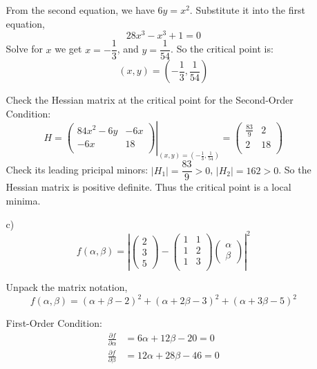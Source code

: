 \documentclass{article}
\begin{document}
\begin{enumerate}
\begin{enumerate}
        From the second equation, we have $6y = x^2$. Substitute it into the first equation,
        $$ 28x^3 - x^3 + 1 = 0 $$
        Solve for $x$ we get $x = -\dfrac{1}{3}$, and $y = \dfrac{1}{54}$. So the critical point is:
        $$ (x, y) = \left( -\frac{1}{3}, \frac{1}{54} \right) $$
        
        Check the Hessian matrix at the critical point for the Second-Order Condition:
        \[
            H = 
            \left.\begin{pmatrix}
                84x^2 - 6y  &  -6x  \\
                -6x         &  18   \\
            \end{pmatrix}
            \right\rvert_{(x, y) = \left( -\frac{1}{3}, \frac{1}{54} \right)}   
            = \begin{pmatrix}
                \frac{83}{9} &  2 \\
                2            & 18 \\
            \end{pmatrix}
        \]
        Check its leading pricipal minors: $|H_1| = \dfrac{83}{9} > 0$, $|H_2| = 162 > 0$. 
        So the Hessian matrix is positive definite. Thus the critical point is a local minima.\\
        
        \item[c)] \[ f(\alpha, \beta) = \left\vert 
            \begin{pmatrix} 2 \\ 3 \\ 5 \end{pmatrix} - 
            \begin{pmatrix}
                1 & 1 \\
                1 & 2 \\
                1 & 3 \\
            \end{pmatrix}
            \begin{pmatrix} \alpha \\ \beta \end{pmatrix}
            \right\vert^2
        \]
        
        Unpack the matrix notation, 
        $$ f(\alpha, \beta) = (\alpha + \beta -2)^2 + (\alpha + 2\beta -3)^2 + (\alpha + 3\beta -5)^2 $$
        
        First-Order Condition:
        \begin{align*}
            \frac{\partial f}{\partial \alpha} &=  6\alpha + 12\beta - 20 = 0 \\ 
            \frac{\partial f}{\partial \beta}  &= 12\alpha + 28\beta - 46 = 0 
        \end{align*}
        

\end{enumerate}
\end{enumerate}
\end{document}
